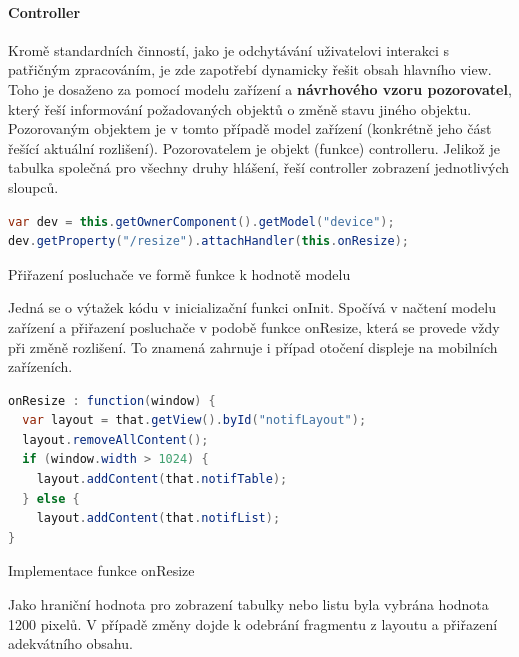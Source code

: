 \documentclass[thesis=M,czech]{FITthesis}[2012/06/26]
\begin{document}
\paragraph{Controller}
Kromě standardních činností, jako je odchytávání uživatelovi interakci s patřičným zpracováním, je zde zapotřebí dynamicky řešit obsah hlavního view. Toho je dosaženo za pomocí modelu zařízení a \textbf{návrhového vzoru pozorovatel}, který řeší informování požadovaných objektů o změně stavu jiného objektu. Pozorovaným objektem je v tomto případě model zařízení (konkrétně jeho část řešící aktuální rozlišení). Pozorovatelem je objekt (funkce) controlleru. Jelikož je tabulka společná pro všechny druhy hlášení, řeší controller zobrazení jednotlivých sloupců. 
\begin{algorithm}[H]
	\begin{lstlisting}[language=java]     
var dev = this.getOwnerComponent().getModel("device");
dev.getProperty("/resize").attachHandler(this.onResize);
	\end{lstlisting}
	\caption{Přiřazení posluchače ve formě funkce k hodnotě modelu}	
	\label{code:resize_attach_handler}
	\small Jedná se o výtažek kódu v inicializační funkci onInit. Spočívá v načtení modelu zařízení a přiřazení posluchače v podobě funkce onResize, která se provede vždy při změně rozlišení. To znamená zahrnuje i případ otočení displeje na mobilních zařízeních.
\end{algorithm}	
\begin{algorithm}[H]
	\begin{lstlisting}[language=java]      
onResize : function(window) {
  var layout = that.getView().byId("notifLayout");
  layout.removeAllContent();
  if (window.width > 1024) {
    layout.addContent(that.notifTable);
  } else {
    layout.addContent(that.notifList);
}
	\end{lstlisting}
	\caption{Implementace funkce onResize}
	\label{code:resize_handler}
	\small Jako hraniční hodnota pro zobrazení tabulky nebo listu byla vybrána hodnota 1200 pixelů. V případě změny dojde k odebrání fragmentu z layoutu a přiřazení adekvátního obsahu.
\end{algorithm}	
\end{document}

